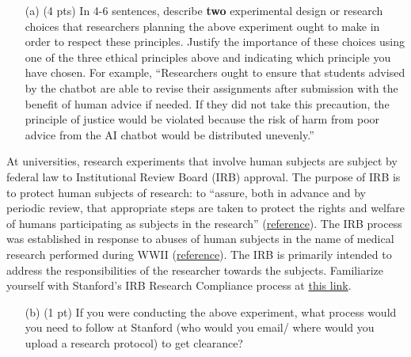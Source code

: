 \documentclass{article}
\begin{document}
\begin{enumerate}
    \item[(a)] {(4 pts)} In 4-6 sentences, describe \textbf{two} experimental  design or research choices that researchers planning the above experiment ought to make in order to respect these principles. Justify the importance of these choices using one of the three ethical principles above and indicating which principle you have chosen. For example, “Researchers ought to ensure that students advised by the chatbot are able to revise their assignments after submission with the benefit of human advice if needed. If they did not take this precaution, the principle of justice would be violated because the risk of harm from poor advice from the AI chatbot would be distributed unevenly.” 
\end{enumerate}

At universities, research experiments that involve human subjects are subject by federal law to Institutional Review Board (IRB) approval.  The purpose of IRB is to protect human subjects of research: to “assure, both in advance and by periodic review, that appropriate steps are taken to protect the rights and welfare of humans participating as subjects in the research” (\href{https://www.fda.gov/about-fda/center-drug-evaluation-and-research-cder/institutional-review-boards-irbs-and-protection-human-subjects-clinical-trials}{reference}). The IRB process was established in response to abuses of human subjects in the name of medical research performed during WWII (\href{https://www.hhs.gov/ohrp/regulations-and-policy/belmont-report/read-the-belmont-report/index.html#xethical}{reference}). The IRB is primarily intended to address the responsibilities of the researcher towards the subjects. Familiarize yourself with Stanford’s IRB Research Compliance process at \href{https://researchcompliance.stanford.edu/panels/hs/forms/for-researchers#need}{this link}.

\begin{enumerate}
    \item[(b)] {(1 pt)} If you were conducting the above experiment, what process would you need to follow at Stanford (who would you email/ where would you upload a research protocol) to get clearance? 
\end{enumerate}
\end{document}
